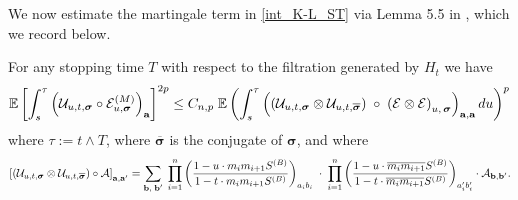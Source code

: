 \begin{definition}
\end{definition}

 We now estimate the martingale term in \eqref{int_K-L_ST} via Lemma 5.5 in \cite{YY_25}, which we record below.

\begin{lemma}\label{lem:DIfREP}
For any stopping time $T$ with respect to the filtration generated by $H_t$ we have
 \begin{equation}\label{alu9_STime}
   \mathbb{E} \left [    \int_{s}^\tau\left(\mathcal{U}_{u, t, \boldsymbol{\sigma}} \circ \mathcal{E}^{(M)}_{u, \boldsymbol{\sigma}}\right)_{\textbf{a}} \right ]^{2p} 
   \le C_{n,p} \; 
   \mathbb{E} \left(\int_{s}^\tau 
   \left(\left(
   \mathcal{U}_{u, t,  \boldsymbol{\sigma}}
   \otimes 
   \mathcal{U}_{u, t,  \overline{\boldsymbol{\sigma}}}
   \right) \;\circ  \;
   \left( \mathcal{E} \otimes  \mathcal{E} \right)
   _{u, \,\boldsymbol{\sigma}  }
   \right)_{{\textbf a}, {\textbf a}}du 
   \right)^{p}
  \end{equation} 
  where $\tau:=t\wedge T$, where  $\overline{\boldsymbol{\sigma}}$ is the conjugate of ${\boldsymbol{\sigma}}$, and where
  $$
  \left[\left(
   \mathcal{U}_{u, t,  \boldsymbol{\sigma}}
   \otimes 
   \mathcal{U}_{u, t,  \overline{\boldsymbol{\sigma}}}
   \right)\circ \cal A\right]_{\textbf{a},\textbf{a}'}=
   \sum_{\textbf{b},\;\textbf{b}'} \; \prod_{i=1}^n \left(\frac{1 - u \cdot m_i m_{i+1} S^{(B)}}{1 - t \cdot m_i m_{i+1} S^{(B)}}\right)_{a_i b_i}
   \;\cdot \;\prod_{i=1}^n \left(\frac{1 - u \cdot \overline{m_i m_{i+1}} S^{(B)}}{1 - t \cdot \overline{m_i m_{i+1}} S^{(B)}}\right)_{a'_i b'_i} \cdot \mathcal{A}_{\textbf{b},\textbf{b}'}.
  $$
\end{lemma}



 
  




